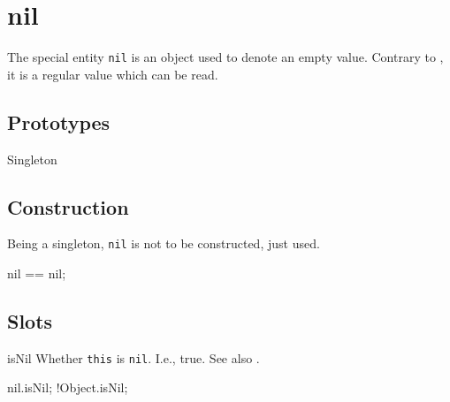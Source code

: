 \section{nil}

The special entity \lstinline|nil| is an object used to denote an
empty value.  Contrary to , it is a regular value
which can be read.

\subsection{Prototypes}

\begin{refObjects}
\item[Singleton]
\end{refObjects}

\subsection{Construction}

Being a singleton, \lstinline|nil| is not to be constructed, just used.

\begin{urbiassert}[firstnumber=1]
nil == nil;
\end{urbiassert}

\subsection{Slots}

\begin{urbiscriptapi}
\item[isNil]
  Whether \lstinline|this| is \lstinline|nil|.  I.e., true.  See also
  .
\begin{urbiassert}
nil.isNil;
!Object.isNil;
\end{urbiassert}

\end{urbiscriptapi}

